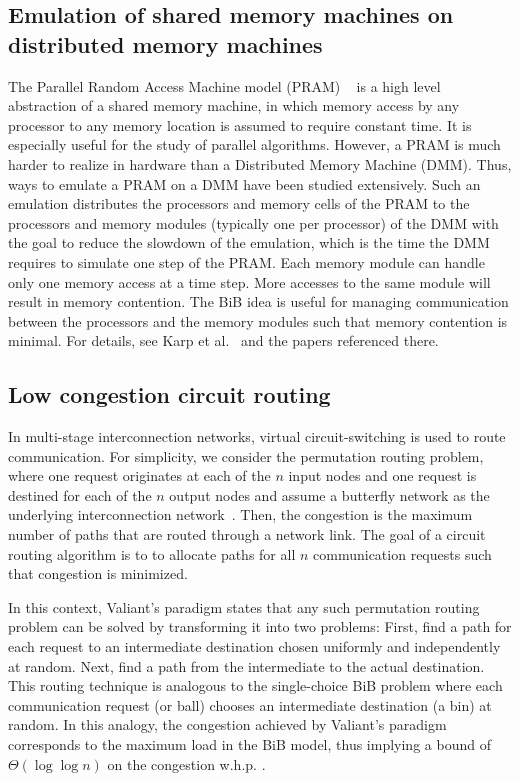 \documentclass[a4paper,12pt]{article}
\begin{document}
\subsection{Emulation of shared memory machines on distributed memory machines}
\label{sec:DMM}
The Parallel Random Access Machine model (PRAM) ~\cite{P03} is a high level abstraction of a shared memory machine, in which memory access by any processor to any memory location is assumed to require constant time. It is especially useful for the study of parallel algorithms. However, a PRAM is much harder to realize in hardware than a Distributed Memory Machine (DMM). Thus, ways to emulate a PRAM on a DMM have been studied extensively. Such an emulation distributes the processors and memory cells of the PRAM to the processors and memory modules (typically one per processor) of the DMM with the goal to reduce the slowdown of the emulation, which is the time the DMM requires to simulate one step of the PRAM. Each memory module can handle only one memory access at a time step. More accesses to the same module will result in memory contention. The BiB idea is useful for managing communication between the processors and the memory modules such that memory contention is minimal. For details, see Karp et al.~\cite{KLM92} and the papers referenced there. 
 
\subsection{Low congestion circuit routing}
\label{sec:circuitrouting}
In multi-stage interconnection networks, virtual circuit-switching is used to route communication. For simplicity, we consider the permutation routing problem, where one request originates at each of the $n$ input nodes and one request is destined for each of the $n$ output nodes and assume a butterfly network as the underlying interconnection network~\cite{CLR09}. Then, the congestion is the maximum number of paths that are routed through a network link. The goal of a circuit routing algorithm is to to allocate paths for all $n$ communication requests such that congestion is minimized.

In this context, Valiant's paradigm \cite{V82} states that any such permutation routing problem can be solved by transforming it into two problems: First, find a path for each request to an intermediate destination chosen uniformly and independently at random. Next, find a path from the intermediate to the actual destination. This routing technique is analogous to the single-choice BiB problem where each communication request (or ball) chooses an intermediate destination (a bin) at random. In this analogy, the congestion achieved by Valiant's paradigm corresponds to the maximum load in the BiB model, thus implying a bound of $\Theta\left(\log \log n\right)$ on the congestion w.h.p. \cite{CMM+98} \cite{MRS01}. 
\end{document}
